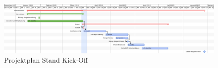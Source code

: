 
\begin{figure}[p]
\centering
\includegraphics[width=1\textheight, angle=90]{images/projektplan.pdf}
\caption{Projektplan Stand Kick-Off}
\label{fig:projektplan}
\end{figure}
